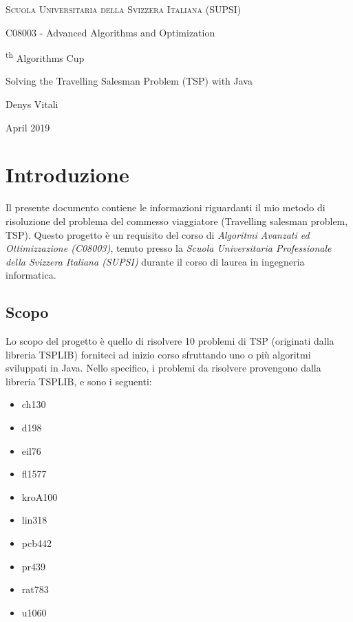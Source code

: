 \documentclass{article}
\newenvironment{itm}{
\begin{itemize}
  \setlength{\itemsep}{2pt}
  \setlength{\parskip}{2pt}
}{\end{itemize}}
\begin{document}
\begin{titlepage}
\centering
    {\scshape Scuola Universitaria della Svizzera Italiana (SUPSI)\par}
    \vspace{0.5cm}
    {C08003 - Advanced Algorithms and Optimization\par}
    \vspace{5cm}
    {
    {\fontsize{1.5cm}{1.5cm}\textsuperscript{th} Algorithms Cup\par}
    \vspace{1cm}
    {\Large Solving the Travelling Salesman Problem (TSP) with Java \par}
    }
    \vspace{8cm}
    {\large Denys Vitali\par}
    \vspace{1cm}
    {\large April 2019}
    \vfill
\end{titlepage}

\pagebreak

\tableofcontents
\pagebreak
\section{Introduzione}
Il presente documento contiene le informazioni riguardanti il mio metodo di
risoluzione del problema del commesso viaggiatore (Travelling salesman problem, TSP).
Questo progetto è un requisito del corso di
\textit{Algoritmi Avanzati ed Ottimizzazione (C08003)}, tenuto presso la 
\textit{Scuola Universitaria Professionale della Svizzera Italiana (SUPSI)} durante il
corso di laurea in ingegneria informatica.
\subsection{Scopo}
Lo scopo del progetto è quello di risolvere 10 problemi di TSP (originati dalla
libreria TSPLIB) forniteci ad inizio corso sfruttando uno o più algoritmi
sviluppati in Java.
Nello specifico, i problemi da risolvere provengono dalla libreria TSPLIB, e
sono i seguenti:
\begin{itm}
\item ch130
\item d198
\item eil76
\item fl1577
\item kroA100
\item lin318
\item pcb442
\item pr439
\item rat783
\item u1060
\end{itm}
\end{document}
